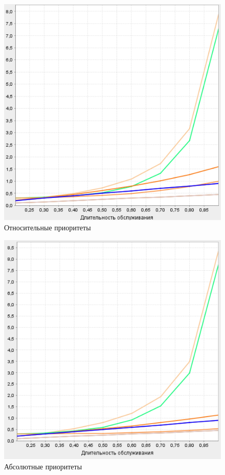 \begin{figure}[h]
\centering
\includegraphics[resolution=200]{img/op.png}
\caption{Относительные приоритеты}
\end{figure}

\begin{figure}[h]
\centering
\includegraphics[resolution=200]{img/ap.png}
\caption{Абсолютные приоритеты}
\end{figure}

